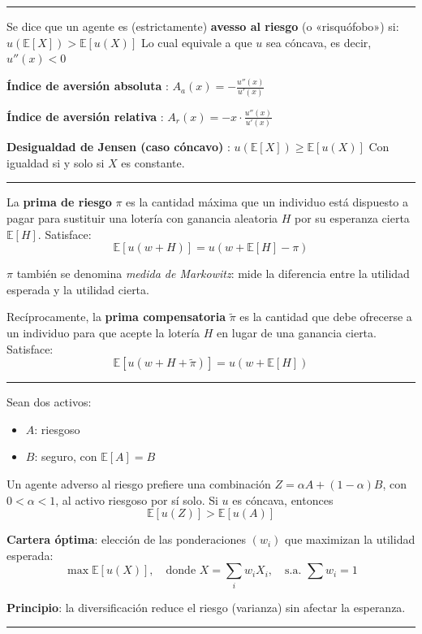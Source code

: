 \hrule

\begin{f}
	Se dice que un agente es (estrictamente) \textbf{avesso al riesgo} (o «risquófobo») si:
	\(\displaystyle
	u(\mathbb{E}[X]) > \mathbb{E}[u(X)]
	\)
	Lo cual equivale a que \(u\) sea cóncava, es decir, \(u''(x) < 0\)
\end{f}

\begin{f}
	\textbf{Índice de aversión absoluta} :
	\(\displaystyle
	A_a(x) = -\frac{u''(x)}{u'(x)}
	\)
	
	\textbf{Índice de aversión relativa} :
	\(\displaystyle
	A_r(x) = -x \cdot \frac{u''(x)}{u'(x)}
	\)
	
	\textbf{Desigualdad de Jensen (caso cóncavo)} :
	\(\displaystyle
	u(\mathbb{E}[X]) \geq \mathbb{E}[u(X)]
	\)
	Con igualdad si y solo si \(X\) es constante.
\end{f}
\hrule


\begin{f}
	
	La \textbf{prima de riesgo} \(\pi\) es la cantidad máxima que un individuo está dispuesto a pagar para sustituir una lotería con ganancia aleatoria \(H\) por su esperanza cierta \(\mathbb{E}[H]\). Satisface:
	\[
	\mathbb{E}[u(w + H)] = u(w + \mathbb{E}[H] - \pi)
	\]
	
	\(\pi\) también se denomina \emph{medida de Markowitz}: mide la diferencia entre la utilidad esperada y la utilidad cierta.
	
	Recíprocamente, la \textbf{prima compensatoria} \(\tilde{\pi}\) es la cantidad que debe ofrecerse a un individuo para que acepte la lotería \(H\) en lugar de una ganancia cierta. Satisface:
	\[
	\mathbb{E}[u(w + H + \tilde{\pi})] = u(w + \mathbb{E}[H])
	\]
	
\end{f}
\hrule
\begin{f}
	
	Sean dos activos:
	\begin{itemize}
		\item \(A\): riesgoso
		\item \(B\): seguro, con \(\mathbb{E}[A] = B\)
	\end{itemize}
	
	Un agente adverso al riesgo prefiere una combinación \(Z = \alpha A + (1 - \alpha) B\), con \(0 < \alpha < 1\), al activo riesgoso por sí solo.
	Si \(u\) es cóncava, entonces
	\[
	\mathbb{E}[u(Z)] > \mathbb{E}[u(A)]
	\]
	
	\textbf{Cartera óptima}: elección de las ponderaciones \((w_i)\) que maximizan la utilidad esperada:
	\[
	\max \mathbb{E}[u(X)], \quad \text{donde } X = \sum_{i} w_i X_i, \quad \text{s.a. } \sum w_i = 1
	\]
	
	\textbf{Principio}: la diversificación reduce el riesgo (varianza) sin afectar la esperanza.
	
	
\end{f}
\hrule

